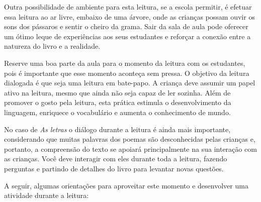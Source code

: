 \documentclass[11pt]{extarticle}
\begin{document}

Outra possibilidade de ambiente para esta leitura, se a escola permitir, 
é efetuar essa leitura ao ar livre, embaixo de uma árvore, onde as crianças 
possam ouvir os sons dos pássaros e sentir o cheiro da grama. Sair da sala 
de aula pode oferecer um ótimo leque de experiências aos seus estudantes e 
reforçar a conexão entre a natureza do livro e a realidade.  

Reserve uma boa parte da aula para o momento da leitura com os estudantes, 
pois é importante que esse momento aconteça sem pressa. O objetivo da 
leitura dialogada é que seja uma leitura em bate-papo. A criança deve 
assumir um papel ativo na leitura, mesmo que ainda não seja capaz de 
ler sozinha. Além de promover o gosto pela leitura, esta prática estimula 
o desenvolvimento da linguagem, enriquece o vocabulário e 
aumenta o conhecimento de mundo.

No caso de \textit{As letras} o diálogo durante a leitura é 
ainda mais importante, considerando que muitas palavras dos poemas são desconhecidas pelas crianças e, portanto, a compreensão do texto se apoiará principalmente na sua interação com as crianças. 
Você deve interagir com eles durante toda a 
leitura, fazendo perguntas e partindo de detalhes do livro para 
levantar novas questões. 

A seguir, algumas orientações para aproveitar este momento e desenvolver uma atividade durante a leitura: 
\end{document}
